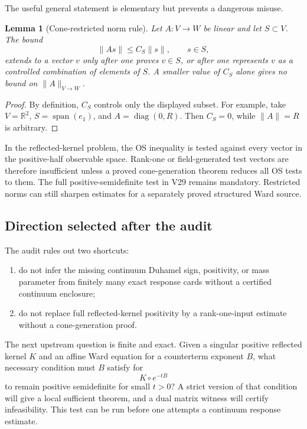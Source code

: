 \documentclass[11pt]{article}
\newtheorem{lemma}[theorem]{Lemma}
\theoremstyle{remark}
\begin{document}
The useful general statement is elementary but prevents a dangerous
misuse.

\begin{lemma}[Cone-restricted norm rule]
\label{lem:v12v30-cone-norm}
Let \(A:V\to W\) be linear and let \(S\subset V\).  The bound
\[
 \|As\|\leq C_S\|s\|,\qquad s\in S,
\]
extends to a vector \(v\) only after one proves \(v\in S\), or after
one represents \(v\) as a controlled combination of elements of
\(S\).  A smaller value of \(C_S\) alone gives no bound on
\(\|A\|_{V\to W}\).
\end{lemma}

\begin{proof}
By definition, \(C_S\) controls only the displayed subset.  For
example, take \(V=\mathbb R^2\), \(S=\operatorname{span}(e_1)\), and
\(A=\operatorname{diag}(0,R)\).  Then \(C_S=0\), while
\(\|A\|=R\) is arbitrary.
\end{proof}

In the reflected-kernel problem, the OS inequality is tested against
every vector in the positive-half observable space.  Rank-one or
field-generated test vectors are therefore insufficient unless a
proved cone-generation theorem reduces all OS tests to them.  The
full positive-semidefinite test in V29 remains mandatory.  Restricted
norms can still sharpen estimates for a separately proved structured
Ward source.

\subsection{Direction selected after the audit}

The audit rules out two shortcuts:

\begin{enumerate}
\item do not infer the missing continuum Duhamel sign, positivity, or
mass parameter from finitely many exact response cards without a
certified continuum enclosure;
\item do not replace full reflected-kernel positivity by a
rank-one-input estimate without a cone-generation proof.
\end{enumerate}

The next upstream question is finite and exact.  Given a singular
positive reflected kernel \(K\) and an affine Ward equation for a
counterterm exponent \(B\), what necessary condition must \(B\)
satisfy for
\[
                         K\circ e^{-tB}
\]
to remain positive semidefinite for small \(t>0\)?  A strict version
of that condition will give a local sufficient theorem, and a dual
matrix witness will certify infeasibility.  This test can be run
before one attempts a continuum response estimate.
\end{document}
